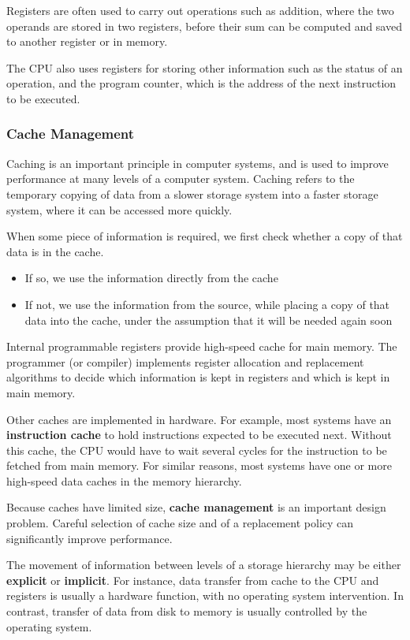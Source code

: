 \documentclass{article}
\begin{document}
Registers are often used to carry out operations such as addition, where the two operands
are stored in two registers, before their sum can be computed and saved to another register or in memory.

The CPU also uses registers for storing other information such as the status of an operation,
and the program counter, which is the address of the next instruction to be executed.
\subsubsection{Cache Management}
Caching is an important principle in computer systems, and is used to improve performance
at many levels of a computer system. Caching refers to the temporary copying of data from a
slower storage system into a faster storage system, where it can be accessed more quickly.

When some piece of information is required, we first check whether
a copy of that data is in the cache.
\begin{itemize}
    \item If so, we use the information directly from the cache
    \item If not, we use the information from the source, while placing a copy of that data into the cache, under
          the assumption that it will be needed again soon
\end{itemize}
Internal programmable registers provide high-speed cache for main memory. The programmer (or compiler)
implements register allocation and replacement algorithms to decide which information is kept in
registers and which is kept in main memory.

Other caches are implemented in hardware. For example, most systems have an \textbf{instruction cache}
to hold instructions expected to be executed next. Without this cache, the CPU would have to wait
several cycles for the instruction to be fetched from main memory. For similar reasons, most
systems have one or more high-speed data caches in the memory hierarchy.

Because caches have limited size, \textbf{cache management} is an important design problem.
Careful selection of cache size and of a replacement policy can significantly improve performance.

The movement of information between levels of a storage hierarchy may be either \textbf{explicit} or \textbf{implicit}.
For instance, data transfer from cache to the CPU and registers is usually a hardware function, with no operating system intervention.
In contrast, transfer of data from disk to memory is usually controlled by the operating system.
\end{document}
